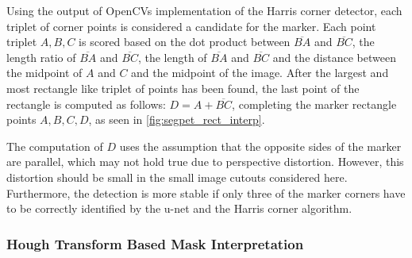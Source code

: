 \documentclass[10pt]{book}
\newcommand{\figureref}[1]{\autoref{#1}}
\begin{document}
Using the output of \acp{OpenCV} implementation of the Harris corner detector, each triplet of corner points is considered a candidate for the marker. Each point triplet $A,B,C$ is scored based on the dot product between $\overline{BA}$ and $\overline{BC}$, the length ratio of $\overline{BA}$ and $\overline{BC}$, the length of $\overline{BA}$ and $\overline{BC}$ and the distance between the midpoint of $A$ and $C$ and the midpoint of the image. After the largest and most rectangle like triplet of points has been found, the last point of the rectangle is computed as follows: $D = A + \overline{BC}$, completing the marker rectangle points $A,B,C,D$, as seen in \figureref{fig:segpet_rect_interp}. 

The computation of $D$ uses the assumption that the opposite sides of the marker are parallel, which may not hold true due to perspective distortion. However, this distortion should be small in the small image cutouts considered here. Furthermore, the detection is more stable if only three of the marker corners have to be correctly identified by the u-net and the Harris corner algorithm. 



\subsubsection{Hough Transform Based Mask Interpretation}
\end{document}
